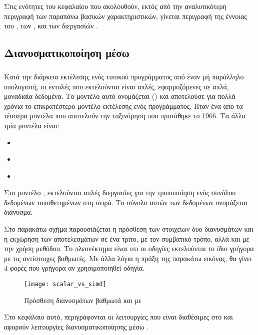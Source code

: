 Στις ενότητες του κεφαλαίου που ακολουθούν, εκτός από την αναλυτικότερη περιγραφή των παραπάνω βασικών χαρακτηριστικών, γίνεται περιγραφή της έννοιας του \emph{}, των \emph{}, και των διεργασίών \emph{}.


\subsection{Διανυσματικοποίηση μέσω \emph{}}
\subparagraph{}

Κατά την διάρκεια εκτέλεσης ενός τυπικού προγράμματος από έναν μή παράλληλο υπολογιστή, οι εντολές που εκτελούνται είναι απλές, εφαρμοζόμενες σε απλά, μοναδιαία δεδομένα. Το μοντέλο αυτό ονομάζεται (\emph{}) και αποτελούσε για πολλά χρόνια το επικρατέστερο μοντέλο εκτέλεσης ενός προγράμματος. Ηταν ένα απο τα τέσσερα μοντέλα που αποτελούν την ταξινόμηση \emph{} που προτάθηκε το 1966\cite{flynn}. Τα άλλα τρία μοντέλα είναι: 
\begin{itemize}
\item{\emph{}}
\item{\emph{}}
\item{\emph{}}
\end{itemize}


Στο μοντέλο \emph{}, εκτελούνται απλές διεργασίες για την τροποποίηση ενός συνόλου δεδομένων τοποθετημένων στη σειρά. Το σύνολο αυτών των δεδομένων ονομάζεται διάνυσμα.

Στο παρακάτω σχήμα παρουσιάζεται η πρόσθεση των στοιχείων δυο διανυσμάτων και η εκχώρηση των αποτελεσμάτων σε ένα τρίτο, με τον συμβατικό τρόπο, αλλά και με την χρήση \emph{} μεθόδου. Το πλεονέκτημα είναι οτι οι \emph{} οδηγίες εκτελούνται το ίδιο γρήγορα με τις αντίστοιχες βαθμωτές. Με άλλα λόγια η πράξη της παρακάτω εικόνας, θα γίνει 4 φορές που γρήγορα αν χρησιμοποιηθεί \emph{} οδηγία.

\begin{figure}[h]
\texttt{[image: scalar\_vs\_simd]}
\centering
\captionsetup{justification=centering, singlelinecheck=false}
	\caption{ Πρόσθεση διανυσμάτων βαθμωτά και με }
\label{fig:scalar_vs_simd}
\end{figure}

 Στο κεφάλαιο αυτό, περιγράφονται οι λειτουργίες που είναι διαθέσιμες στο \emph{} και αφορούν λειτουργίες διανυσματικοποίησης μέσω \emph{}. 

